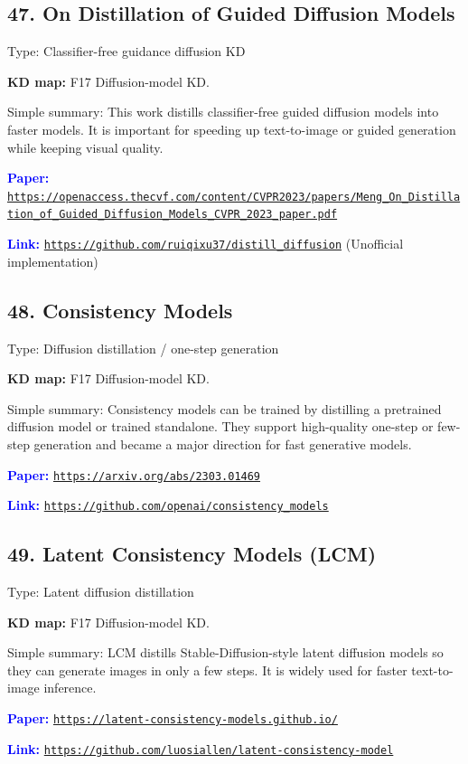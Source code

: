 \documentclass[10pt]{article}
\begin{document}
\subsection*{47. On Distillation of Guided Diffusion Models}
Type: Classifier-free guidance diffusion KD\par
\textbf{KD map:} F17 Diffusion-model KD.\par
Simple summary: This work distills classifier-free guided diffusion models into faster models. It is important for speeding up text-to-image or guided generation while keeping visual quality.\par
\textcolor{blue}{\textbf{Paper:}} \href{https://openaccess.thecvf.com/content/CVPR2023/papers/Meng_On_Distillation_of_Guided_Diffusion_Models_CVPR_2023_paper.pdf}{\nolinkurl{https://openaccess.thecvf.com/content/CVPR2023/papers/Meng_On_Distillation_of_Guided_Diffusion_Models_CVPR_2023_paper.pdf}}\par
\textcolor{blue}{\textbf{Link:}} \href{https://github.com/ruiqixu37/distill_diffusion}{\nolinkurl{https://github.com/ruiqixu37/distill_diffusion}} (Unofficial implementation)\par

\subsection*{48. Consistency Models}
Type: Diffusion distillation / one-step generation\par
\textbf{KD map:} F17 Diffusion-model KD.\par
Simple summary: Consistency models can be trained by distilling a pretrained diffusion model or trained standalone. They support high-quality one-step or few-step generation and became a major direction for fast generative models.\par
\textcolor{blue}{\textbf{Paper:}} \href{https://arxiv.org/abs/2303.01469}{\nolinkurl{https://arxiv.org/abs/2303.01469}}\par
\textcolor{blue}{\textbf{Link:}} \href{https://github.com/openai/consistency_models}{\nolinkurl{https://github.com/openai/consistency_models}}\par

\subsection*{49. Latent Consistency Models (LCM)}
Type: Latent diffusion distillation\par
\textbf{KD map:} F17 Diffusion-model KD.\par
Simple summary: LCM distills Stable-Diffusion-style latent diffusion models so they can generate images in only a few steps. It is widely used for faster text-to-image inference.\par
\textcolor{blue}{\textbf{Paper:}} \href{https://latent-consistency-models.github.io/}{\nolinkurl{https://latent-consistency-models.github.io/}}\par
\textcolor{blue}{\textbf{Link:}} \href{https://github.com/luosiallen/latent-consistency-model}{\nolinkurl{https://github.com/luosiallen/latent-consistency-model}}\par
\end{document}
